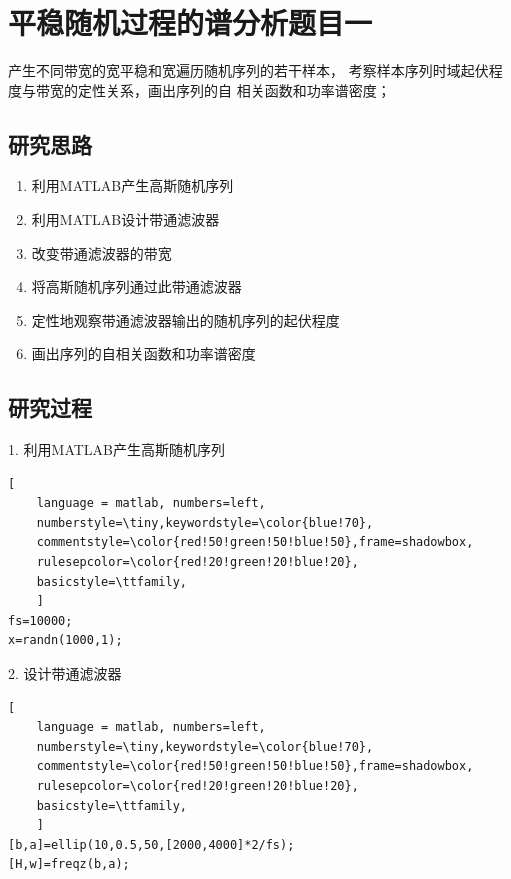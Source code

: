 \documentclass[UTF-8, a4paper, 12pt]{ctexart}
\title{\bfseries \Huge  }
\author{}
\date{}
\begin{document}




\tableofcontents

\newpage

\section{平稳随机过程的谱分析题目一}

产生不同带宽的宽平稳和宽遍历随机序列的若干样本，
    考察样本序列时域起伏程度与带宽的定性关系，画出序列的自
    相关函数和功率谱密度；

\subsection{研究思路}
\begin{enumerate}
    \item 利用MATLAB产生高斯随机序列
    \item 利用MATLAB设计带通滤波器
    \item 改变带通滤波器的带宽
    \item 将高斯随机序列通过此带通滤波器
    \item 定性地观察带通滤波器输出的随机序列的起伏程度
    \item 画出序列的自相关函数和功率谱密度
\end{enumerate}
\subsection{研究过程}

1. 利用MATLAB产生高斯随机序列
\begin{lstlisting}[
	language = matlab, numbers=left, 
	numberstyle=\tiny,keywordstyle=\color{blue!70},
	commentstyle=\color{red!50!green!50!blue!50},frame=shadowbox,
	rulesepcolor=\color{red!20!green!20!blue!20},
	basicstyle=\ttfamily,
	]
fs=10000;
x=randn(1000,1);
\end{lstlisting}

2. 设计带通滤波器
\begin{lstlisting}[
	language = matlab, numbers=left, 
	numberstyle=\tiny,keywordstyle=\color{blue!70},
	commentstyle=\color{red!50!green!50!blue!50},frame=shadowbox,
	rulesepcolor=\color{red!20!green!20!blue!20},
	basicstyle=\ttfamily,
	]
[b,a]=ellip(10,0.5,50,[2000,4000]*2/fs);
[H,w]=freqz(b,a);
\end{lstlisting}
\end{document}
